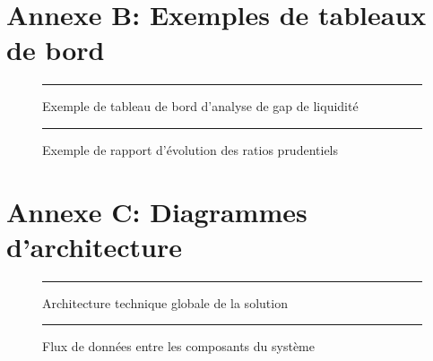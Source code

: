 \documentclass[12pt,a4paper]{report}
\begin{document}
\section*{Annexe B: Exemples de tableaux de bord}
\begin{figure}[h]
    \centering
    \rule{10cm}{7cm} %
    \caption{Exemple de tableau de bord d'analyse de gap de liquidité}
\end{figure}

\begin{figure}[h]
    \centering
    \rule{10cm}{7cm} %
    \caption{Exemple de rapport d'évolution des ratios prudentiels}
\end{figure}

\section*{Annexe C: Diagrammes d'architecture}
\begin{figure}[h]
    \centering
    \rule{12cm}{8cm} %
    \caption{Architecture technique globale de la solution}
\end{figure}

\begin{figure}[h]
    \centering
    \rule{12cm}{8cm} %
    \caption{Flux de données entre les composants du système}
\end{figure}
\end{document}
